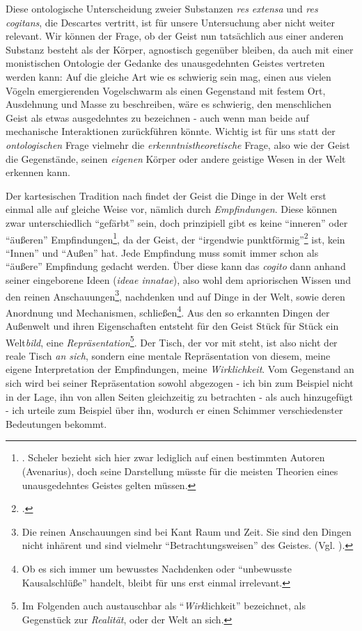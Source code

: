 \documentclass[a4paper, 12pt]{article}
\begin{document}
\begin{onehalfspace}
Diese ontologische Unterscheidung zweier Substanzen \emph{res extensa} und \emph{res cogitans}, die Descartes vertritt, ist für unsere Untersuchung aber nicht weiter relevant. Wir können der Frage, ob der Geist nun tatsächlich aus einer anderen Substanz besteht als der Körper, agnostisch gegenüber bleiben, da auch mit einer monistischen Ontologie der Gedanke des unausgedehnten Geistes vertreten werden kann: Auf die gleiche Art wie es schwierig sein mag, einen aus vielen Vögeln emergierenden Vogelschwarm als einen Gegenstand mit festem Ort, Ausdehnung und Masse zu beschreiben, wäre es schwierig, den menschlichen Geist als etwas ausgedehntes zu bezeichnen - auch wenn man beide auf mechanische Interaktionen zurückführen könnte. Wichtig ist für uns statt der \emph{ontologischen} Frage vielmehr die \emph{erkenntnistheoretische} Frage, also wie der Geist die Gegenstände, seinen \emph{eigenen} Körper oder andere geistige Wesen in der Welt erkennen kann.


Der kartesischen Tradition nach findet der Geist die Dinge in der Welt erst einmal alle auf gleiche Weise vor, nämlich durch \emph{Empfindungen}. Diese können zwar unterschiedlich "`gefärbt"' sein, doch prinzipiell gibt es keine "`inneren"' oder "`äußeren"' Empfindungen\footnote{\Cite[Vgl.][S. 501)]{scheler-ethik}. Scheler bezieht sich hier zwar lediglich auf einen bestimmten Autoren (Avenarius), doch seine Darstellung müsste für die meisten Theorien eines unausgedehntes Geistes gelten müssen.}, da der Geist, der "`irgendwie punktförmig"'\footnote{\Cite[Siehe][S. 270]{scheler-idole}.} ist, kein "`Innen"' und "`Außen"' hat. Jede Empfindung muss somit immer schon als "`äußere"' Empfindung gedacht werden. Über diese kann das \emph{cogito} dann anhand seiner eingeborene Ideen (\emph{ideae innatae}), also wohl dem apriorischen Wissen und den reinen Anschauungen\footnote{Die reinen Anschauungen sind bei Kant Raum und Zeit. Sie sind den Dingen nicht inhärent und sind vielmehr "`Betrachtungsweisen"' des Geistes. (Vgl. \cite{sep-kant}).}, nachdenken und auf Dinge in der Welt, sowie deren Anordnung und Mechanismen, schließen\footnote{Ob es sich immer um bewusstes Nachdenken oder "`unbewusste Kausalschlüße"' handelt, bleibt für uns erst einmal irrelevant.}. Aus den so erkannten Dingen der Außenwelt und ihren Eigenschaften entsteht für den Geist Stück für Stück ein Welt\emph{bild}, eine \emph{Repräsentation}\footnote{Im Folgenden auch austauschbar als "`\emph{Wirk}lichkeit"' bezeichnet, als Gegenstück zur \emph{Realität}, oder der Welt an sich.}. Der Tisch, der vor mit steht, ist also nicht der reale Tisch \emph{an sich}, sondern eine mentale Repräsentation von diesem, meine eigene Interpretation der Empfindungen, meine \emph{Wirklichkeit}. Vom Gegenstand an sich wird bei seiner Repräsentation sowohl abgezogen - ich bin zum Beispiel nicht in der Lage, ihn von allen Seiten gleichzeitig zu betrachten - als auch hinzugefügt - ich urteile zum Beispiel über ihn, wodurch er einen Schimmer verschiedenster Bedeutungen bekommt.


\end{onehalfspace}
\end{document}
